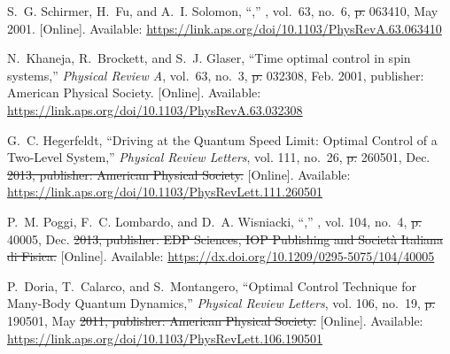\documentclass[a4paper,oneside,11pt]{book}
\providecommand{\DIFaddtex}[1]{{\protect\color{blue}\uwave{#1}}} %
\providecommand{\DIFdeltex}[1]{{\protect\color{red}\sout{#1}}}                      %
\providecommand{\DIFaddbegin}{} %
\providecommand{\DIFaddend}{} %
\providecommand{\DIFdelbegin}{} %
\providecommand{\DIFdelend}{} %
\providecommand{\DIFadd}[1]{\texorpdfstring{\DIFaddtex{#1}}{#1}} %
\providecommand{\DIFdel}[1]{\texorpdfstring{\DIFdeltex{#1}}{}} %
\newcommand{\DIFscaledelfig}{0.5}
\newlength{\DIFdelgraphicswidth} %
\newlength{\DIFdelgraphicsheight} %
\newcommand{\DIFaddincludegraphics}[2][]{{\color{blue}\fbox{\DIFOincludegraphics[#1]{#2}}}} %
\newcommand{\DIFdelincludegraphics}[2][]{%
\sbox{\DIFdelgraphicsbox}{\DIFOincludegraphics[#1]{#2}}%
\settoboxwidth{\DIFdelgraphicswidth}{\DIFdelgraphicsbox} %
\settoboxtotalheight{\DIFdelgraphicsheight}{\DIFdelgraphicsbox} %
\scalebox{\DIFscaledelfig}{%
\parbox[b]{\DIFdelgraphicswidth}{\usebox{\DIFdelgraphicsbox}\\[-\baselineskip] \rule{\DIFdelgraphicswidth}{0em}}\llap{\resizebox{\DIFdelgraphicswidth}{\DIFdelgraphicsheight}{%
\setlength{\unitlength}{\DIFdelgraphicswidth}%
\begin{picture}(1,1)%
\thicklines\linethickness{2pt} %
{\color[rgb]{1,0,0}\put(0,0){\framebox(1,1){}}}%
{\color[rgb]{1,0,0}\put(0,0){\line( 1,1){1}}}%
{\color[rgb]{1,0,0}\put(0,1){\line(1,-1){1}}}%
\end{picture}%
}\hspace*{3pt}}} %
} %
\DeclareRobustCommand{\DIFaddbegin}{\DIFOaddbegin \let\includegraphics\DIFaddincludegraphics} %
\DeclareRobustCommand{\DIFaddend}{\DIFOaddend \let\includegraphics\DIFOincludegraphics} %
\DeclareRobustCommand{\DIFdelbegin}{\DIFOdelbegin \let\includegraphics\DIFdelincludegraphics} %
\DeclareRobustCommand{\DIFdelend}{\DIFOaddend \let\includegraphics\DIFOincludegraphics} %
\begin{document}
\begin{thebibliography}{100}
\BIBentryALTinterwordspacing
S.~G. Schirmer, H.~Fu, and A.~I. Solomon, ``,'' \emph{}, vol.~63, no.~6,  \DIFdelbegin \DIFdel{p. }\DIFdelend 063410, May 2001. [Online]. Available:
  \url{https://link.aps.org/doi/10.1103/PhysRevA.63.063410}
\BIBentrySTDinterwordspacing

\BIBentryALTinterwordspacing
N.~Khaneja, R.~Brockett, and S.~J. Glaser, ``Time optimal control in spin
  systems,'' \emph{Physical Review A}, vol.~63, no.~3,  \DIFdelbegin \DIFdel{p. }\DIFdelend 032308, Feb. 2001,
  publisher: American Physical Society. [Online]. Available:
  \url{https://link.aps.org/doi/10.1103/PhysRevA.63.032308}
\BIBentrySTDinterwordspacing

\BIBentryALTinterwordspacing
G.~C. Hegerfeldt, ``Driving at the {Quantum} {Speed} {Limit}: {Optimal}
  {Control} of a {Two}-{Level} {System},'' \emph{Physical Review Letters}, vol.
  111, no.~26,  \DIFdelbegin \DIFdel{p. }\DIFdelend 260501, Dec. \DIFdelbegin \DIFdel{2013, publisher: American Physical Society.
  }\DIFdelend \DIFaddbegin \DIFadd{2013. }\DIFaddend [Online]. Available:
  \url{https://link.aps.org/doi/10.1103/PhysRevLett.111.260501}
\BIBentrySTDinterwordspacing

\BIBentryALTinterwordspacing
P.~M. Poggi, F.~C. Lombardo, and D.~A. Wisniacki,
  ``,'' \emph{},
  vol. 104, no.~4,  \DIFdelbegin \DIFdel{p. }\DIFdelend 40005, Dec. \DIFdelbegin \DIFdel{2013, publisher: EDP Sciences, IOP Publishing
  and Società Italiana di Fisica. }\DIFdelend \DIFaddbegin \DIFadd{2013. }\DIFaddend [Online]. Available:
  \url{https://dx.doi.org/10.1209/0295-5075/104/40005}
\BIBentrySTDinterwordspacing

\BIBentryALTinterwordspacing
P.~Doria, T.~Calarco, and S.~Montangero, ``Optimal {Control} {Technique} for
  {Many}-{Body} {Quantum} {Dynamics},'' \emph{Physical Review Letters}, vol.
  106, no.~19,  \DIFdelbegin \DIFdel{p. }\DIFdelend 190501, May \DIFdelbegin \DIFdel{2011, publisher: American Physical Society.
  }\DIFdelend \DIFaddbegin \DIFadd{2011. }\DIFaddend [Online]. Available:
  \url{https://link.aps.org/doi/10.1103/PhysRevLett.106.190501}
\BIBentrySTDinterwordspacing


\end{thebibliography}
\end{document}
